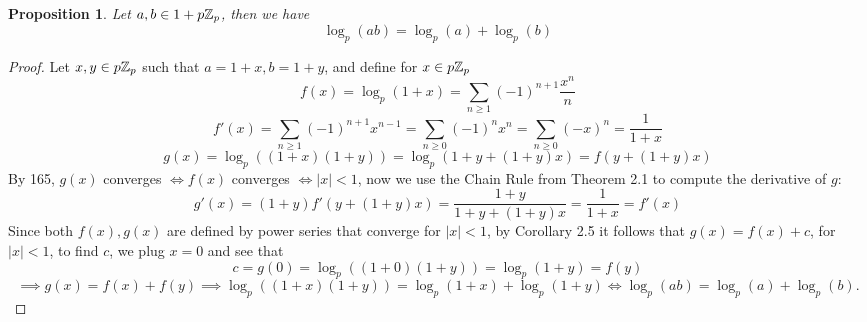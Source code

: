 \documentclass[a4paper]{article}
\theoremstyle{plain}
\newtheorem{prop}[thm]{Proposition}
\theoremstyle{definition}
\begin{document}
\begin{prop}
  Let $a, b \in 1+p\Bbb Z_{p}$, then we have
  $$\log_{p}(ab) = \log_{p}(a) + \log_{p}(b)$$
\end{prop}
\begin{proof}
  Let $x, y \in p\Bbb Z_{p}$ such that $a= 1+x, b =1+y$, and define for $x \in p\Bbb Z_{p}$
  $$f(x) = \log_{p}(1+x) = \sum_{n \geq 1}(-1)^{n+1}\frac {x^{n}}{n}$$
  $$f'(x) = \sum_{n \geq 1} (-1)^{n+1}x^{n-1} = \sum_{n \geq 0} (-1)^{n}x^{n} = \sum_{n \geq 0}(-x)^{n} = \frac{1}{1+x}$$
  $$g(x) = \log_{p}((1+x)(1+y)) = \log_{p}(1+y + (1+y)x) = f(y + (1+y)x)$$
  By 165, $g(x)$ converges $\iff f(x)$ converges $\iff |x| < 1$, now we use the Chain Rule from Theorem 2.1 to compute the derivative of $g$:
  $$g'(x) = (1+y)f'(y+(1+y)x) = \frac{1+y}{1+y+(1+y)x} = \frac{1}{1+x} = f'(x)$$
  Since both $f(x), g(x)$ are defined by power series that converge for $|x| < 1$, by Corollary 2.5 it follows that
  $g(x) = f(x) + c$, for $|x| < 1$, to find $c$, we plug $x=0$ and see that
  $$c = g(0) = \log_{p}((1+0)(1+y)) = \log_{p}(1+y) = f(y)$$
  $$ \implies g(x) = f(x) + f(y) \implies \log_{p}((1+x)(1+y)) = \log_{p}(1+x) + \log_{p}(1+y) \iff \log_{p}(ab) = \log_{p}(a) + \log_{p}(b).$$
\end{proof}
\end{document}
